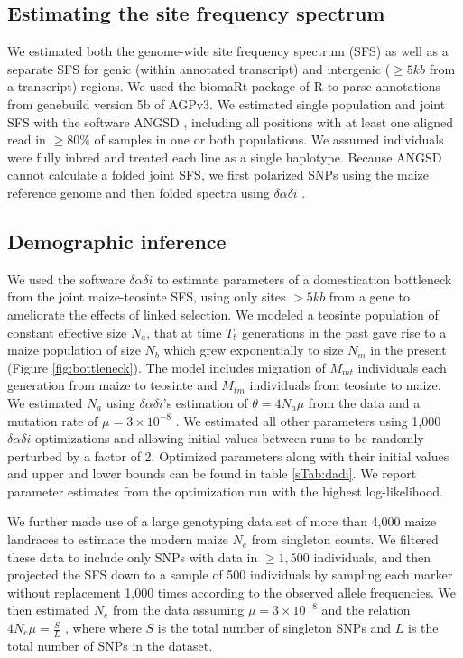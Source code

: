 \documentclass{pnastwo}
\begin{document}
\begin{article}
\begin{materials}
\subsection{Estimating the site frequency spectrum}
We estimated both the genome-wide site frequency spectrum (SFS) as well as a separate SFS for genic (within annotated transcript) and intergenic ($\geq 5kb$ from a transcript) regions. 
We used the biomaRt package \cite{durinck2009,durinck2005} of R \cite{R2014} to parse annotations from genebuild version 5b of AGPv3. 
We estimated single population and joint SFS with the software ANGSD \cite{korneliussen2014}, including all positions with at least one aligned read in $\geq 80\%$ of samples in one or both populations.
We assumed individuals were fully inbred and treated each line as a single haplotype. Because ANGSD cannot calculate a folded joint SFS, we first polarized SNPs using the maize reference genome and then folded spectra using $\delta\alpha\delta{i}$ \cite{gutenkunst2009}.

\subsection{Demographic inference}
We used the software $\delta\alpha\delta{i}$ \cite{gutenkunst2009} to estimate parameters of a domestication bottleneck from the joint maize-teosinte SFS, using only sites $>5 kb$ from a gene to ameliorate the effects of linked selection.
We modeled a teosinte population of constant effective size $N_a$, that at time $T_b$ generations in the past gave rise to a maize population of size $N_b$ which grew exponentially to size $N_m$ in the present (Figure \ref{fig:bottleneck}).
The model includes migration of $M_{mt}$ individuals each generation from maize to teosinte and $M_{tm}$ individuals from teosinte to maize.  We estimated $N_a$ using $\delta\alpha\delta{i}$'s estimation of $\theta=4N_a\mu$ from the data and a mutation rate of $\mu = 3 \times 10^{-8}$ \cite{clark2005}. 
We estimated all other parameters using 1,000 $\delta\alpha\delta{i}$ optimizations and allowing initial values between runs to be randomly perturbed by a factor of 2.  
Optimized parameters along with their initial values and upper and lower bounds can be found in table \ref{sTab:dadi}. We report parameter estimates from the optimization run with the highest log-likelihood.

We further made use of a large genotyping data set of more than 4,000 maize landraces \cite{Hearne2015} to estimate the modern maize $N_e$ from singleton counts.
We filtered these data to include only SNPs with data in $\geq 1,500$ individuals, and then projected the SFS down to a sample of 500 individuals by sampling each marker without replacement 1,000 times according to the observed allele frequencies.
We then estimated $N_e$ from the data assuming $\mu = 3 \times 10^{-8}$ \cite{clark2005} and the relation  $4N_e\mu = \frac{S}{L}$ \cite{fu1993}, where where $S$ is the total number of singleton SNPs and $L$ is the total number of SNPs in the dataset.


\end{materials}
\end{article}
\end{document}
